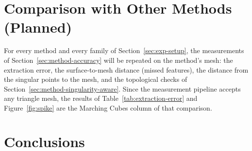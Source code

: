\section{Comparison with Other Methods (Planned)}
\label{sec:exp-comparison}

\begin{center}
\end{center}

For every method and every family of Section~\ref{sec:exp-setup}, the
measurements of Section~\ref{sec:method-accuracy} will be repeated on the
method's mesh: the extraction error, the surface-to-mesh distance (missed
features), the distance from the singular points to the mesh, and the
topological checks of Section~\ref{sec:method-singularity-aware}. Since the
measurement pipeline accepts any triangle mesh, the results of
Table~\ref{tab:extraction-error} and Figure~\ref{fig:spike} are the Marching
Cubes column of that comparison.

\section{Conclusions}
\label{sec:exp-conclusions}

